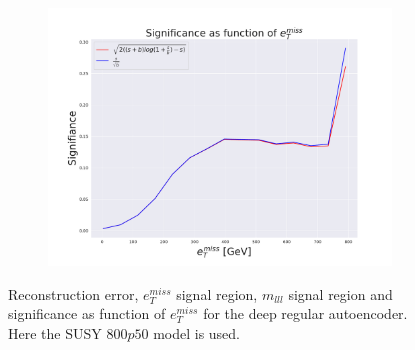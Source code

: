 \begin{figure}[H]
    \begin{subfigure}{.40\textwidth}
        \includegraphics[width=\textwidth]{Figures/VAE_testing/big/2lep/significance_etmiss_800p0p050_-0.3616098672654746.pdf}
        \caption{}
        \label{fig:VAE_2lep_big_signi_800_3}
    \end{subfigure}
    \hfill      
    \caption[2lep deep network | $800p50$ | VAE | 3]{Reconstruction error, $e_T^{miss}$ signal region, $m_{lll}$ signal region and significance as function of 
    $e_T^{miss}$ for the deep regular autoencoder. Here the SUSY $800p50$ model is used.}
    \label{fig:VAE_2lep_big_rec_sig_signi_800_3}
\end{figure}

